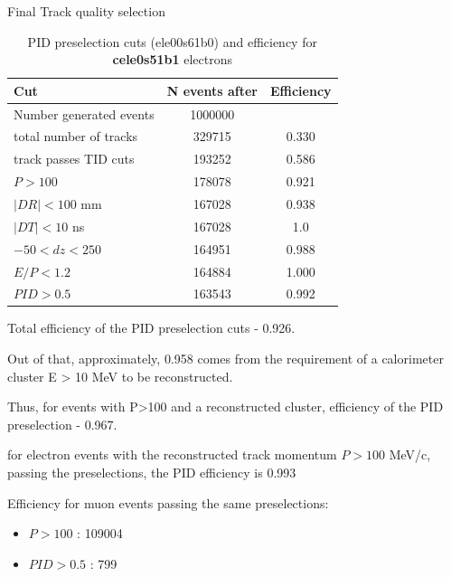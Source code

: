 \begin{table}[h!]
  \begin{center}
    \caption{Final Track quality selection}
    \label{tab:table1}
    \begin{tabular}{l|c|c} %
      \textbf{Cut}                    & \textbf{N events after } & \textbf{Efficiency }\\
      \hline
      Number generated events         & 1000000          &            \\
      total number of tracks          &  329715          &   0.330    \\
      \hline
      track passes TID cuts           &  193252          &   0.586    \\
      $P > 100$                       &  178078          &   0.921    \\
      $|DR| < 100$ mm                 &  167028          &   0.938    \\
      $|DT| < 10$ ns                  &  167028          &   1.0      \\
      $-50 < dz < 250$                &  164951          &   0.988    \\
      $ E/P < 1.2$                    &  164884          &   1.000    \\
      \hline
      $PID >0.5$                      &  163543          &   0.992    \\
   \end{tabular}
  \end{center}
  \caption{
    PID preselection cuts (ele00s61b0) and efficiency for {\bf cele0s51b1} electrons 
  }
\end{table}

Total efficiency of the PID preselection cuts - 0.926. 

Out of that, approximately, 0.958 comes from the requirement of a calorimeter cluster E > 10 MeV to be reconstructed.

Thus, for events with P>100 and a reconstructed cluster, efficiency of the PID preselection - 0.967.

for electron events with the reconstructed track momentum $P > 100$ MeV/c, passing the preselections, 
the PID efficiency is 0.993


Efficiency for muon events passing the same preselections: 

\begin{itemize}
\item
  $P > 100$                       : 109004
\item 
  $PID >0.5$                      :    799
\end{itemize}


